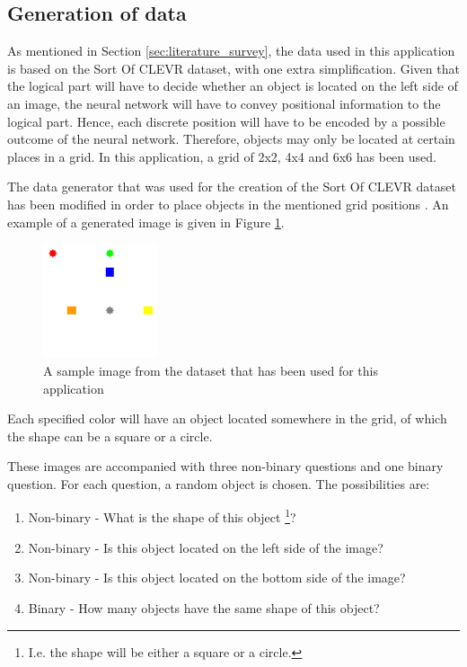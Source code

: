 \documentclass[english]{sobraep}
\begin{document}

\subsection{Generation of data}
As mentioned in Section \ref{sec:literature_survey}, the data used in this application is based on the Sort Of CLEVR dataset, with one extra simplification. Given that the logical part will have to decide whether an object is located on the left side of an image, the neural network will have to convey positional information to the logical part. Hence, each discrete position will have to be encoded by a possible outcome of the neural network. Therefore, objects may only be located at certain places in a grid. In this application, a grid of 2x2, 4x4 and 6x6 has been used.

The data generator that was used for the creation of the Sort Of CLEVR dataset has been modified in order to place objects in the mentioned grid positions \cite{sort_of_clevr_dataset}. An example of a generated image is given in Figure \ref{fig:sample_image_own_dataset}.

\begin{figure}[H]
    \begin{center}
    \includegraphics[width=0.3\textwidth]{sample_image_dataset.png}
    \captionsetup{justification=centering}
    \caption{A sample image from the dataset that has been used for this application}
    \label{fig:sample_image_own_dataset}
    \end{center}
\end{figure}

Each specified color will have an object located somewhere in the grid, of which the shape can be a square or a circle.

These images are accompanied with three non-binary questions and one binary question. For each question, a random object is chosen. The possibilities are:
\begin{enumerate}
    \item Non-binary - What is the shape of this object \footnote{I.e. the shape will be either a square or a circle.}?
    \item Non-binary - Is this object located on the left side of the image?
    \item Non-binary - Is this object located on the bottom side of the image?
    \item Binary - How many objects have the same shape of this object?
\end{enumerate}
\end{document}
